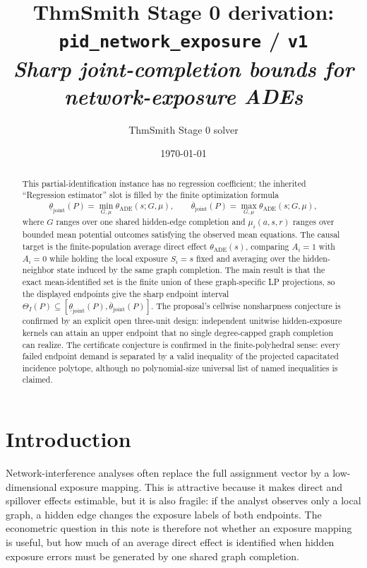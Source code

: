 \documentclass[11pt]{article}
\title{ThmSmith Stage 0 derivation: \texttt{pid\_network\_exposure} / \texttt{v1}%
  \\ \large\textit{Sharp joint-completion bounds for network-exposure ADEs}}
\author{ThmSmith Stage 0 solver}
\date{\today}
\theoremstyle{definition}
\theoremstyle{plain}
\theoremstyle{remark}
\begin{document}
\maketitle


\begin{abstract}
This partial-identification instance has no regression coefficient; the inherited
``Regression estimator'' slot is filled by the finite optimization formula
\[
\underline\theta_{\mathrm{joint}}(P)
=\min_{G,\mu}\theta_{\mathrm{ADE}}(s;G,\mu),
\qquad
\overline\theta_{\mathrm{joint}}(P)
=\max_{G,\mu}\theta_{\mathrm{ADE}}(s;G,\mu),
\]
where \(G\) ranges over one shared hidden-edge completion and \(\mu_i(a,s,r)\)
ranges over bounded mean potential outcomes satisfying the observed mean
equations.  The causal target is the finite-population average direct effect
\(\theta_{\mathrm{ADE}}(s)\), comparing \(A_i=1\) with \(A_i=0\) while holding
the local exposure \(S_i=s\) fixed and averaging over the hidden-neighbor state
induced by the same graph completion.  The main result is that the exact
mean-identified set is the finite union of these graph-specific LP projections,
so the displayed endpoints give the sharp endpoint interval
\(\Theta_I(P)\subseteq
[\underline\theta_{\mathrm{joint}}(P),\overline\theta_{\mathrm{joint}}(P)]\).
The proposal's cellwise nonsharpness conjecture is confirmed by an explicit
open three-unit design: independent unitwise hidden-exposure kernels can attain
an upper endpoint that no single degree-capped graph completion can realize.
The certificate conjecture is confirmed in the finite-polyhedral sense: every
failed endpoint demand is separated by a valid inequality of the projected
capacitated incidence polytope, although no polynomial-size universal list of
named inequalities is claimed.
\end{abstract}

\section{Introduction}
Network-interference analyses often replace the full assignment vector by a
low-dimensional exposure mapping.  This is attractive because it makes direct
and spillover effects estimable, but it is also fragile: if the analyst observes
only a local graph, a hidden edge changes the exposure labels of both endpoints.
The econometric question in this note is therefore not whether an exposure
mapping is useful, but how much of an average direct effect is identified when
hidden exposure errors must be generated by one shared graph completion.
\end{document}
